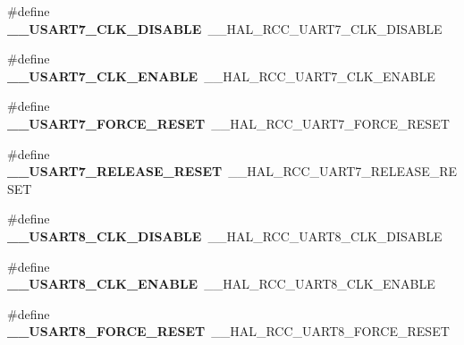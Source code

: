 \begin{DoxyCompactItemize}
\#define {\bfseries \+\_\+\+\_\+\+U\+S\+A\+R\+T7\+\_\+\+C\+L\+K\+\_\+\+D\+I\+S\+A\+B\+LE}~\+\_\+\+\_\+\+H\+A\+L\+\_\+\+R\+C\+C\+\_\+\+U\+A\+R\+T7\+\_\+\+C\+L\+K\+\_\+\+D\+I\+S\+A\+B\+LE
\item 
\mbox{\label{group___h_a_l___r_c_c___aliased_ga9686a6b050f6e8e97cbea3e270cb70a4}} 
\#define {\bfseries \+\_\+\+\_\+\+U\+S\+A\+R\+T7\+\_\+\+C\+L\+K\+\_\+\+E\+N\+A\+B\+LE}~\+\_\+\+\_\+\+H\+A\+L\+\_\+\+R\+C\+C\+\_\+\+U\+A\+R\+T7\+\_\+\+C\+L\+K\+\_\+\+E\+N\+A\+B\+LE
\item 
\mbox{\label{group___h_a_l___r_c_c___aliased_ga06c91b1d0f80f1d44dd7718aa8145eec}} 
\#define {\bfseries \+\_\+\+\_\+\+U\+S\+A\+R\+T7\+\_\+\+F\+O\+R\+C\+E\+\_\+\+R\+E\+S\+ET}~\+\_\+\+\_\+\+H\+A\+L\+\_\+\+R\+C\+C\+\_\+\+U\+A\+R\+T7\+\_\+\+F\+O\+R\+C\+E\+\_\+\+R\+E\+S\+ET
\item 
\mbox{\label{group___h_a_l___r_c_c___aliased_gafa09a5eefe6ef876ceb35c5c7e927b90}} 
\#define {\bfseries \+\_\+\+\_\+\+U\+S\+A\+R\+T7\+\_\+\+R\+E\+L\+E\+A\+S\+E\+\_\+\+R\+E\+S\+ET}~\+\_\+\+\_\+\+H\+A\+L\+\_\+\+R\+C\+C\+\_\+\+U\+A\+R\+T7\+\_\+\+R\+E\+L\+E\+A\+S\+E\+\_\+\+R\+E\+S\+ET
\item 
\mbox{\label{group___h_a_l___r_c_c___aliased_ga156c3013249722a6533154a3c34cb8e5}} 
\#define {\bfseries \+\_\+\+\_\+\+U\+S\+A\+R\+T8\+\_\+\+C\+L\+K\+\_\+\+D\+I\+S\+A\+B\+LE}~\+\_\+\+\_\+\+H\+A\+L\+\_\+\+R\+C\+C\+\_\+\+U\+A\+R\+T8\+\_\+\+C\+L\+K\+\_\+\+D\+I\+S\+A\+B\+LE
\item 
\mbox{\label{group___h_a_l___r_c_c___aliased_gadd38e5a3ecd0dd0f8118af0447a096c9}} 
\#define {\bfseries \+\_\+\+\_\+\+U\+S\+A\+R\+T8\+\_\+\+C\+L\+K\+\_\+\+E\+N\+A\+B\+LE}~\+\_\+\+\_\+\+H\+A\+L\+\_\+\+R\+C\+C\+\_\+\+U\+A\+R\+T8\+\_\+\+C\+L\+K\+\_\+\+E\+N\+A\+B\+LE
\item 
\mbox{\label{group___h_a_l___r_c_c___aliased_ga3a8aed7e7c3dbbb9f4f93d298a813a13}} 
\#define {\bfseries \+\_\+\+\_\+\+U\+S\+A\+R\+T8\+\_\+\+F\+O\+R\+C\+E\+\_\+\+R\+E\+S\+ET}~\+\_\+\+\_\+\+H\+A\+L\+\_\+\+R\+C\+C\+\_\+\+U\+A\+R\+T8\+\_\+\+F\+O\+R\+C\+E\+\_\+\+R\+E\+S\+ET
\item 

\end{DoxyCompactItemize}
